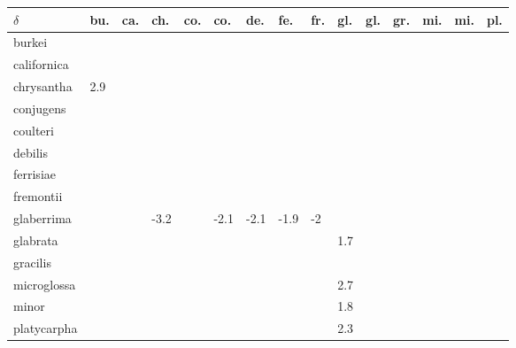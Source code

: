 \begin{table}[ht]
\centering
\begin{tabular}{lllllllllllllll}
  \hline
$\delta$ & bu. & ca. & ch. & co. & co. & de. & fe. & fr. & gl. & gl. & gr. & mi. & mi. & pl. \\ 
  \hline
burkei &  &  &  &  &  &  &  &  &  &  &  &  &  &  \\ 
  californica &  &  &  &  &  &  &  &  &  &  &  &  &  &  \\ 
  chrysantha & 2.9 &  &  &  &  &  &  &  &  &  &  &  &  &  \\ 
  conjugens &  &  &  &  &  &  &  &  &  &  &  &  &  &  \\ 
  coulteri &  &  &  &  &  &  &  &  &  &  &  &  &  &  \\ 
  debilis &  &  &  &  &  &  &  &  &  &  &  &  &  &  \\ 
  ferrisiae &  &  &  &  &  &  &  &  &  &  &  &  &  &  \\ 
  fremontii &  &  &  &  &  &  &  &  &  &  &  &  &  &  \\ 
  glaberrima &  &  & -3.2 &  & -2.1 & -2.1 & -1.9 & -2 &  &  &  &  &  &  \\ 
  glabrata &  &  &  &  &  &  &  &  & 1.7 &  &  &  &  &  \\ 
  gracilis &  &  &  &  &  &  &  &  &  &  &  &  &  &  \\ 
  microglossa &  &  &  &  &  &  &  &  & 2.7 &  &  &  &  &  \\ 
  minor &  &  &  &  &  &  &  &  & 1.8 &  &  &  &  &  \\ 
  platycarpha &  &  &  &  &  &  &  &  & 2.3 &  &  &  &  &  \\ 
   \hline
\end{tabular}
\end{table}
